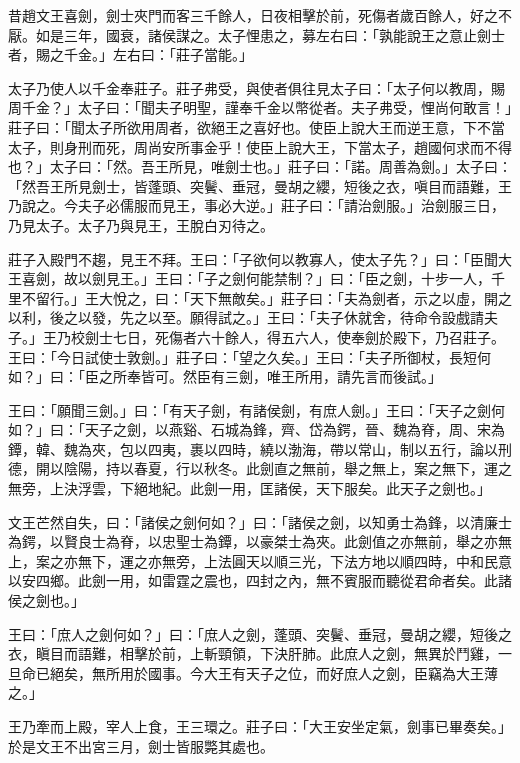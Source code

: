 
\begin{pinyinscope}
昔趙文王喜劍，劍士夾門而客三千餘人，日夜相擊於前，死傷者歲百餘人，好之不厭。如是三年，國衰，諸侯謀之。太子悝患之，募左右曰：「孰能說王之意止劍士者，賜之千金。」左右曰：「莊子當能。」

太子乃使人以千金奉莊子。莊子弗受，與使者俱往見太子曰：「太子何以教周，賜周千金？」太子曰：「聞夫子明聖，謹奉千金以幣從者。夫子弗受，悝尚何敢言！」莊子曰：「聞太子所欲用周者，欲絕王之喜好也。使臣上說大王而逆王意，下不當太子，則身刑而死，周尚安所事金乎！使臣上說大王，下當太子，趙國何求而不得也？」太子曰：「然。吾王所見，唯劍士也。」莊子曰：「諾。周善為劍。」太子曰：「然吾王所見劍士，皆蓬頭、突鬢、垂冠，曼胡之纓，短後之衣，嗔目而語難，王乃說之。今夫子必儒服而見王，事必大逆。」莊子曰：「請治劍服。」治劍服三日，乃見太子。太子乃與見王，王脫白刃待之。

莊子入殿門不趨，見王不拜。王曰：「子欲何以教寡人，使太子先？」曰：「臣聞大王喜劍，故以劍見王。」王曰：「子之劍何能禁制？」曰：「臣之劍，十步一人，千里不留行。」王大悅之，曰：「天下無敵矣。」莊子曰：「夫為劍者，示之以虛，開之以利，後之以發，先之以至。願得試之。」王曰：「夫子休就舍，待命令設戲請夫子。」王乃校劍士七日，死傷者六十餘人，得五六人，使奉劍於殿下，乃召莊子。王曰：「今日試使士敦劍。」莊子曰：「望之久矣。」王曰：「夫子所御杖，長短何如？」曰：「臣之所奉皆可。然臣有三劍，唯王所用，請先言而後試。」

王曰：「願聞三劍。」曰：「有天子劍，有諸侯劍，有庶人劍。」王曰：「天子之劍何如？」曰：「天子之劍，以燕谿、石城為鋒，齊、岱為鍔，晉、魏為脊，周、宋為鐔，韓、魏為夾，包以四夷，裹以四時，繞以渤海，帶以常山，制以五行，論以刑德，開以陰陽，持以春夏，行以秋冬。此劍直之無前，舉之無上，案之無下，運之無旁，上決浮雲，下絕地紀。此劍一用，匡諸侯，天下服矣。此天子之劍也。」

文王芒然自失，曰：「諸侯之劍何如？」曰：「諸侯之劍，以知勇士為鋒，以清廉士為鍔，以賢良士為脊，以忠聖士為鐔，以豪桀士為夾。此劍值之亦無前，舉之亦無上，案之亦無下，運之亦無旁，上法圓天以順三光，下法方地以順四時，中和民意以安四鄉。此劍一用，如雷霆之震也，四封之內，無不賓服而聽從君命者矣。此諸侯之劍也。」

王曰：「庶人之劍何如？」曰：「庶人之劍，蓬頭、突鬢、垂冠，曼胡之纓，短後之衣，瞋目而語難，相擊於前，上斬頸領，下決肝肺。此庶人之劍，無異於鬥雞，一旦命已絕矣，無所用於國事。今大王有天子之位，而好庶人之劍，臣竊為大王薄之。」

王乃牽而上殿，宰人上食，王三環之。莊子曰：「大王安坐定氣，劍事已畢奏矣。」於是文王不出宮三月，劍士皆服斃其處也。


\end{pinyinscope}